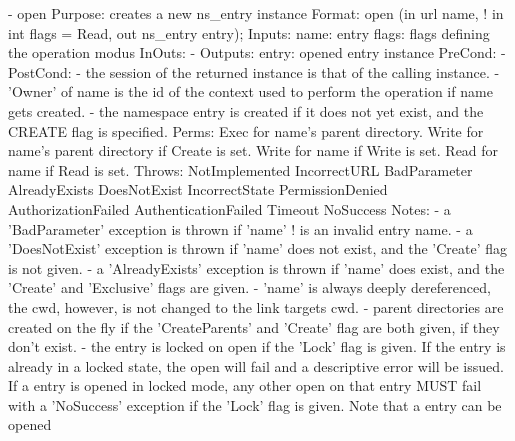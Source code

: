 \begin{myspec}
 
    - open
      Purpose:  creates a new ns_entry instance
      Format:   open               (in  url       name,
!                                   in  int       flags = Read,
                                    out ns_entry  entry);
      Inputs:   name:               entry
                flags:              flags defining the operation
                                    modus
      InOuts:   -
      Outputs:  entry:              opened entry instance
      PreCond:  -
      PostCond: - the session of the returned instance is that
                  of the calling instance.
                - 'Owner' of name is the id of the context
                  used to perform the operation if name gets
                  created.
                - the namespace entry is created if it does not 
                  yet exist, and the CREATE flag is specified.
      Perms:    Exec  for name's parent directory.
                Write for name's parent directory if Create is set.
                Write for name if Write is set.
                Read  for name if Read  is set.
      Throws:   NotImplemented
                IncorrectURL
                BadParameter
                AlreadyExists
                DoesNotExist
                IncorrectState
                PermissionDenied
                AuthorizationFailed
                AuthenticationFailed
                Timeout
                NoSuccess
      Notes:    - a 'BadParameter' exception is thrown if 'name'
!                 is an invalid entry name.
                - a 'DoesNotExist' exception is thrown if 'name'
                  does not exist, and the 'Create' flag is not
                  given.
                - a 'AlreadyExists' exception is thrown if 'name'
                  does exist, and the 'Create' and 'Exclusive' 
                  flags are given.
                - 'name' is always deeply dereferenced, the cwd,
                  however, is not changed to the link targets
                  cwd.
                - parent directories are created on the fly if
                  the 'CreateParents' and 'Create' flag are both
                  given, if they don't exist.
                - the entry is locked on open if the 'Lock' flag
                  is given.  If the entry is already in a locked
                  state, the open will fail and a descriptive
                  error will be issued.  If a entry is opened in
                  locked mode, any other open on that entry MUST
                  fail with a 'NoSuccess' exception if the 'Lock'
                  flag is given.  Note that a entry can be opened

\end{myspec}
